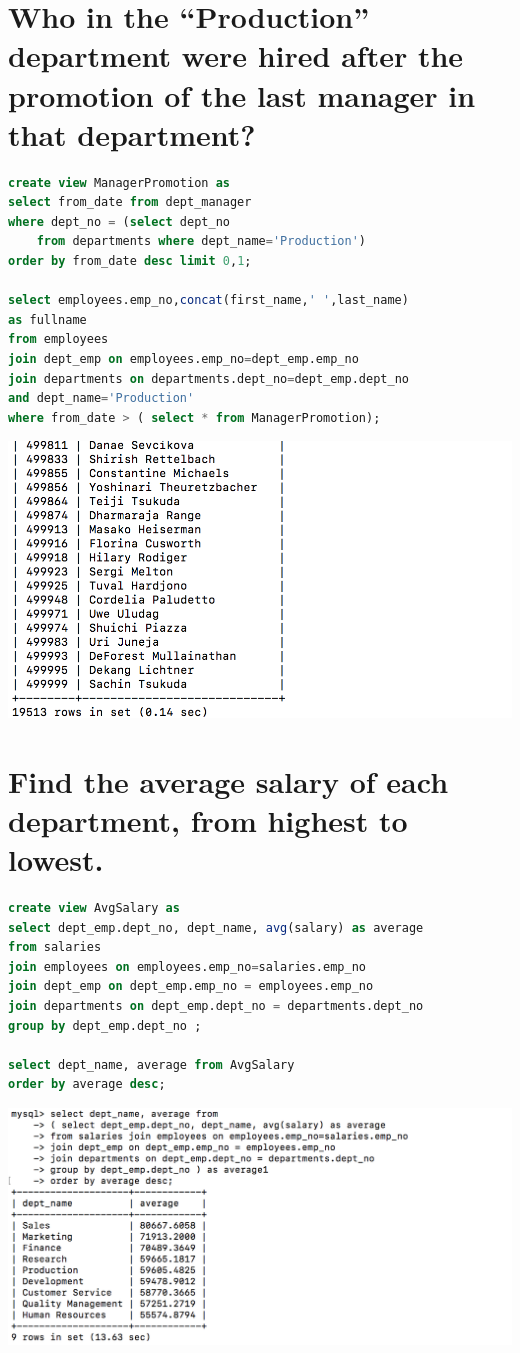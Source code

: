 \documentclass{article}
\begin{document}
\section{Who in the “Production” department were hired after the promotion of the last manager in that department?}
\begin{lstlisting}[language=sql]
create view ManagerPromotion as
select from_date from dept_manager 
where dept_no = (select dept_no 
	from departments where dept_name='Production') 
order by from_date desc limit 0,1;

select employees.emp_no,concat(first_name,' ',last_name) 
as fullname
from employees 
join dept_emp on employees.emp_no=dept_emp.emp_no 
join departments on departments.dept_no=dept_emp.dept_no 
and dept_name='Production'
where from_date > ( select * from ManagerPromotion);

\end{lstlisting}
\includegraphics[width=\linewidth]{2.png}

\section{Find the average salary of each department, from highest to lowest.}
\begin{lstlisting}[language=sql]
create view AvgSalary as
select dept_emp.dept_no, dept_name, avg(salary) as average 
from salaries 
join employees on employees.emp_no=salaries.emp_no 
join dept_emp on dept_emp.emp_no = employees.emp_no
join departments on dept_emp.dept_no = departments.dept_no
group by dept_emp.dept_no ;

select dept_name, average from AvgSalary
order by average desc;
\end{lstlisting}
\includegraphics[width=\linewidth]{3.png}
\end{document}
